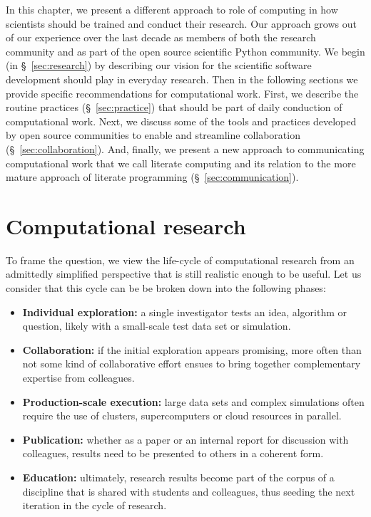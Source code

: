 \documentclass[ChapterTOCs,krantz2]{krantz} %
\theoremstyle{definition}
\begin{document}
In this chapter, we present a different approach to role of computing in how
scientists should be trained and conduct their research. Our approach grows out
of our experience over the last decade as members of both the research
community and as part of the open source scientific Python community.  We begin
(in §~\ref{sec:research}) by describing our vision for the scientific
software development should play in everyday research. Then in the following
sections we provide specific recommendations for computational work. First,
we describe the routine practices (§~\ref{sec:practice}) that should be
part of daily conduction of computational work. Next, we discuss some of
the tools and practices developed by open source communities to enable
and streamline collaboration (§~\ref{sec:collaboration}). And, finally,
we present a new approach to communicating computational work that we call
literate computing and its relation to the more mature approach of literate
programming (§~\ref{sec:communication}).


\section{\label{sec:research}Computational research}

To frame the question, we view the life-cycle of computational research from an
admittedly simplified perspective that is still realistic enough to be
useful. Let us consider that this cycle can be be broken down into the
following phases:

\begin{itemize}
\item \textbf{Individual exploration:} a single investigator tests an idea,
  algorithm or question, likely with a small-scale test data set or simulation.
\item \textbf{Collaboration:} if the initial exploration appears promising,
  more often than not some kind of collaborative effort ensues to bring
  together complementary expertise from colleagues.
\item \textbf{Production-scale execution:} large data sets and complex
  simulations often require the use of clusters, supercomputers or cloud
  resources in parallel.
\item \textbf{Publication:} whether as a paper or an internal report for
  discussion with colleagues, results need to be presented to others in a
  coherent form.
\item \textbf{Education:} ultimately, research results become part of the
  corpus of a discipline that is shared with students and colleagues, thus
  seeding the next iteration in the cycle of research.
\end{itemize}
\end{document}
